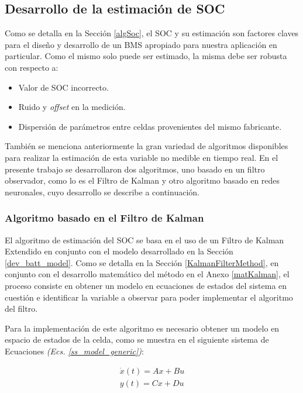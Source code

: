 \documentclass[10pt,a4paper]{article}
\newcounter{subsubsubsection}[subsubsection]
\begin{document}
\subsection{Desarrollo de la estimaci\'on de \acrshort{SOC}}

Como se detalla en la Secci\'on \ref{algSoc}, el \acrshort{SOC} y su
estimaci\'on son factores claves para el diseño y desarrollo de un
\acrshort{BMS} apropiado para nuestra aplicaci\'on en particular. Como el mismo
solo puede ser estimado, la misma debe ser robusta con respecto a:

\begin{itemize}
    \item Valor de \acrshort{SOC} incorrecto.
    \item Ruido y \emph{offset} en la medici\'on.
    \item Dispersi\'on de par\'ametros entre celdas provenientes del mismo
        fabricante.
\end{itemize}

Tambi\'en se menciona anteriormente la gran variedad de algoritmos disponibles
para realizar la estimaci\'on de esta variable no medible en tiempo real. En el
presente trabajo se desarrollaron dos algoritmos, uno basado en un filtro
observador, como lo es el Filtro de Kalman y otro algoritmo basado en redes
neuronales, cuyo desarrollo se describe a continuaci\'on.

\subsubsection{Algoritmo basado en el Filtro de Kalman}

El algoritmo de estimaci\'on del \acrshort{SOC} se basa en el uso 
de un Filtro de Kalman Extendido en conjunto con el modelo desarrollado en la 
Secci\'on \ref{dev_batt_model}. Como se detalla en la Secci\'on
\ref{KalmanFilterMethod}, en conjunto con el desarrollo matem\'atico del
m\'etodo en el Anexo \ref{matKalman}, el proceso consiste en obtener un modelo
en ecuaciones de estados del sistema en cuesti\'on e identificar la variable a 
observar para poder implementar el algoritmo del filtro.


Para la implementaci\'on de este algoritmo es necesario obtener un modelo en
espacio de estados de la celda, como se muestra en el siguiente sistema de
Ecuaciones \emph{(Ecs. \ref{ss_model_generic})}:

\begin{align}
    \dot{x}(t) = Ax+Bu	\nonumber\\
    y(t)=Cx+Du
    \label{ss_model_generic}	
\end{align}
\end{document}
